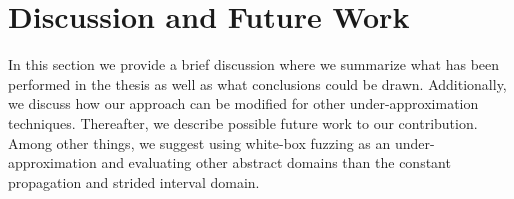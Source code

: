 \documentclass{kththesis}
\newcommand{\fbcomment}[1]{{#1}}
\renewcommand{\fbcomment}[1]{}
\begin{document}



\chapter{Discussion and Future Work}\label{chap:discussionAndConclusions}
\fbcomment{\color{red}Goal: Discuss the results and draw conclusions}
In this section we provide a brief discussion where we summarize what has been performed in the thesis as well as what conclusions could be drawn. Additionally, we discuss how our approach can be modified for other under-approximation techniques. Thereafter, we describe possible future work to our contribution. Among other things, we suggest using white-box fuzzing as an under-approximation and evaluating other abstract domains than the constant propagation and strided interval domain.
\end{document}
